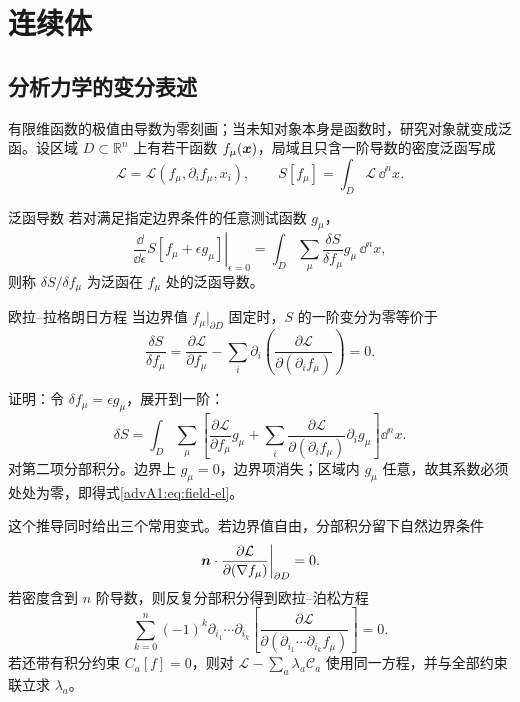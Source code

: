 \section{连续体}

\subsection{分析力学的变分表述}

有限维函数的极值由导数为零刻画；当未知对象本身是函数时，研究对象就变成泛函。设区域
$D\subset\mathbb R^n$ 上有若干函数 $f_\mu(\bm{x})$，局域且只含一阶导数的密度泛函写成
\[
 \mathcal L=\mathcal L(f_\mu,\partial_i f_\mu,x_i),
 \qquad
 S[f_\mu]=\int_D\mathcal L\,\dd^n x .
\]

\begin{advdefinition}{泛函导数}\label{advA1:def:functional-derivative}
若对满足指定边界条件的任意测试函数 $g_\mu$，
\[
 \left.\frac{\dd}{\dd\epsilon}S[f_\mu+\epsilon g_\mu]\right|_{\epsilon=0}
 =\int_D\sum_\mu\frac{\delta S}{\delta f_\mu}g_\mu\,\dd^n x ,
\]
则称 $\delta S/\delta f_\mu$ 为泛函在 $f_\mu$ 处的泛函导数。
\end{advdefinition}

\begin{advtheorem}{欧拉--拉格朗日方程}\label{advA1:thm:field-el}
当边界值 $f_\mu|_{\partial D}$ 固定时，$S$ 的一阶变分为零等价于
\begin{equation}\label{advA1:eq:field-el}
 \frac{\delta S}{\delta f_\mu}
 =\frac{\partial\mathcal L}{\partial f_\mu}
 -\sum_i\partial_i\left(
 \frac{\partial\mathcal L}{\partial(\partial_i f_\mu)}\right)=0 .
\end{equation}
\end{advtheorem}
证明：令 $\delta f_\mu=\epsilon g_\mu$，展开到一阶：
\[
 \delta S=\int_D\sum_\mu\left[
 \frac{\partial\mathcal L}{\partial f_\mu}g_\mu+
 \sum_i\frac{\partial\mathcal L}{\partial(\partial_i f_\mu)}
 \partial_i g_\mu\right]\dd^n x .
\]
对第二项分部积分。边界上 $g_\mu=0$，边界项消失；区域内 $g_\mu$ 任意，故其系数必须处处为零，即得式\eqref{advA1:eq:field-el}。

这个推导同时给出三个常用变式。若边界值自由，分部积分留下自然边界条件
\[
 \left.\bm{n}\cdot
 \frac{\partial\mathcal L}{\partial(\nabla f_\mu)}\right|_{\partial D}=0.
\]
若密度含到 $n$ 阶导数，则反复分部积分得到欧拉--泊松方程
\[
 \sum_{k=0}^{n}(-1)^k\partial_{i_1}\cdots\partial_{i_k}
 \left[\frac{\partial\mathcal L}
 {\partial(\partial_{i_1}\cdots\partial_{i_k}f_\mu)}\right]=0.
\]
若还带有积分约束 $C_a[f]=0$，则对
$\mathcal L-\sum_a\lambda_a\mathcal C_a$ 使用同一方程，并与全部约束联立求 $\lambda_a$。

